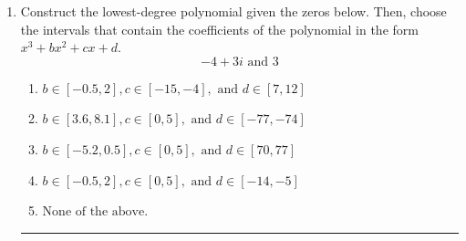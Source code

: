 \documentclass[14pt]{extbook}
\newcommand{\litem}[1]{\item#1\hspace*{-1cm}\rule{\textwidth}{0.4pt}}
\begin{document}
\begin{enumerate}
{\begin{enumerate}[label=\Alph*.]
\end{enumerate} }
\litem{
Construct the lowest-degree polynomial given the zeros below. Then, choose the intervals that contain the coefficients of the polynomial in the form $x^3+bx^2+cx+d$.\[ -4 + 3 i \text{ and } 3 \]\begin{enumerate}[label=\Alph*.]
\item \( b \in [-0.5, 2], c \in [-15, -4], \text{ and } d \in [7, 12] \)
\item \( b \in [3.6, 8.1], c \in [0, 5], \text{ and } d \in [-77, -74] \)
\item \( b \in [-5.2, 0.5], c \in [0, 5], \text{ and } d \in [70, 77] \)
\item \( b \in [-0.5, 2], c \in [0, 5], \text{ and } d \in [-14, -5] \)
\item \( \text{None of the above.} \)


\end{enumerate}}
\end{enumerate}
\end{document}
